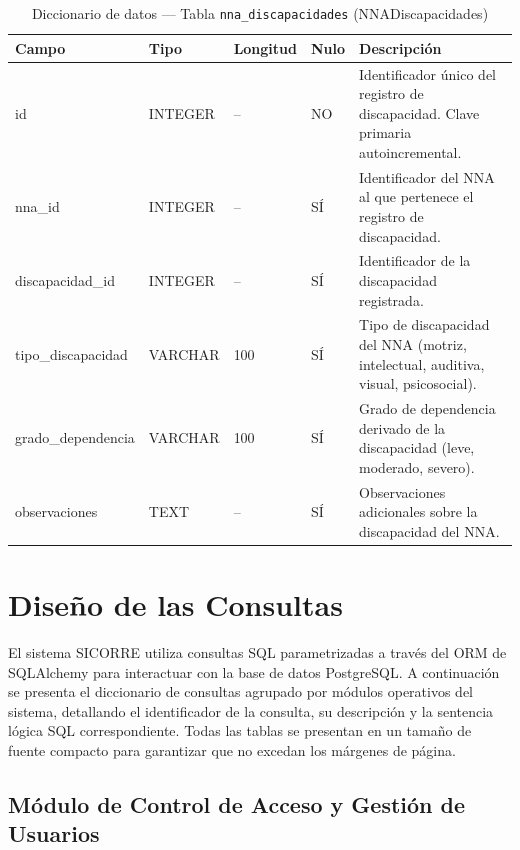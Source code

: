 \begin{table}[H]
	\centering
	\caption{Diccionario de datos --- Tabla \texttt{nna\_discapacidades} (NNADiscapacidades)}
	\label{tab:data-dict-nna_discapacidades}
	\scriptsize
	\begin{tabular}{>{\ttfamily\raggedright\arraybackslash}p{3.6cm} p{1.6cm} p{1.3cm} p{0.7cm} p{5.6cm}}
		\toprule
		\textbf{Campo} & \textbf{Tipo} & \textbf{Longitud} & \textbf{Nulo} & \textbf{Descripción} \\
		\midrule
		id & INTEGER & -- & NO & Identificador único del registro de discapacidad. Clave primaria autoincremental. \\
		nna\_id & INTEGER & -- & SÍ & Identificador del NNA al que pertenece el registro de discapacidad. \\
		discapacidad\_id & INTEGER & -- & SÍ & Identificador de la discapacidad registrada. \\
		tipo\_discapacidad & VARCHAR & 100 & SÍ & Tipo de discapacidad del NNA (motriz, intelectual, auditiva, visual, psicosocial). \\
		grado\_dependencia & VARCHAR & 100 & SÍ & Grado de dependencia derivado de la discapacidad (leve, moderado, severo). \\
		observaciones & TEXT & -- & SÍ & Observaciones adicionales sobre la discapacidad del NNA. \\
		\bottomrule
	\end{tabular}
\end{table}


\section{Diseño de las Consultas}

El sistema SICORRE utiliza consultas SQL parametrizadas a través del ORM de SQLAlchemy para interactuar con la base de datos PostgreSQL. A continuación se presenta el diccionario de consultas agrupado por módulos operativos del sistema, detallando el identificador de la consulta, su descripción y la sentencia lógica SQL correspondiente. Todas las tablas se presentan en un tamaño de fuente compacto para garantizar que no excedan los márgenes de página.

\subsection{Módulo de Control de Acceso y Gestión de Usuarios}

